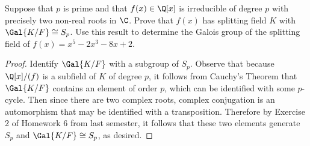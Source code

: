 \documentclass[10pt]{amsart}
\begin{document}
\setcounter{thm}{3}
\begin{thm}
  Suppose that $p$ is prime and that $f(x) \in \Q[x]$ is irreducible of degree $p$ with precisely two non-real roots in $\C$.
  Prove that $f(x)$ has splitting field $K$ with $\Gal{K/F} \cong S_p$.
  Use this result to determine the Galois group of the splitting field of $f(x) = x^5 - 2x^3 - 8x + 2$.
  
  \begin{proof}
    Identify $\Gal{K/F}$ with a subgroup of $S_p$.
    Observe that because $\Q[x]/(f)$ is a subfield of $K$ of degree $p$, it follows from Cauchy's Theorem that $\Gal{K/F}$ contains an element of order $p$, which can be identified with some $p$-cycle.
    Then since there are two complex roots, complex conjugation is an automorphism that may be identified with a transposition.
    Therefore by Exercise 2 of Homework 6 from last semester, it follows that these two elements generate $S_p$ and $\Gal{K/F} \cong S_p$, as desired.
  \end{proof}
\end{thm}
\end{document}
